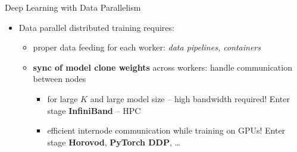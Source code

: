 \begin{frame}{Deep Learning with Data Parallelism}
\protect\hypertarget{deep-learning-with-data-parallelism-13}{}

\begin{itemize}
\tightlist
\item
  Data parallel distributed training requires:

  \begin{itemize}
  \tightlist
  \item
    proper data feeding for each worker: \emph{data pipelines,
    containers}
  \item
    \textbf{sync of model clone weights} across workers: handle
    communication between nodes

    \begin{itemize}
    \tightlist
    \item
      for large \(K\) and large model size -- high bandwidth required!
      Enter stage \textbf{InfiniBand} -- HPC
    \item
      efficient internode communication while training on GPUs! Enter
      stage \textbf{Horovod}, \textbf{PyTorch DDP}, \ldots{}
    \end{itemize}
  \end{itemize}
\end{itemize}


\end{frame}

